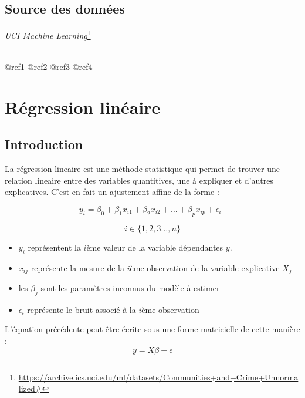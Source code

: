 \documentclass[
]{book}
\providecommand{\tightlist}{%
  \setlength{\itemsep}{0pt}\setlength{\parskip}{0pt}}
\begin{document}
\hypertarget{source-des-donnuxe9es}{%
\section{Source des données}\label{source-des-donnuxe9es}}

\emph{UCI Machine Learning}\footnote{\url{https://archive.ics.uci.edu/ml/datasets/Communities+and+Crime+Unnormalized\#}}\strut \\
@ref1
@ref2
@ref3
@ref4

\hypertarget{linearModel}{%
\chapter{Régression linéaire}\label{linearModel}}

\hypertarget{introduction-1}{%
\section{Introduction}\label{introduction-1}}

La régression lineaire est une méthode statistique qui permet de trouver une relation lineaire entre des variables quantitives, une à expliquer et d'autres explicatives. C'est en fait un ajustement affine de la forme :

\begin{equation}
y_i = \beta_0 + \beta_1x_{i1} + \beta_2x_{i2} +\dots+\beta_px_{ip}+\epsilon_{i}\;\; 
\end{equation}

\[i\in\{1,2,3\dots,n\}\]

\begin{itemize}
\tightlist
\item
  \(y_i\) représentent la \(i\)ème valeur de la variable dépendantes \(y\).
\item
  \(x_{ij}\) représente la mesure de la \(i\)ème observation de la variable explicative \(X_j\)
\item
  les \(\beta_j\) sont les paramètres inconnus du modèle à estimer
\item
  \(\epsilon_i\) représente le bruit associé à la \(i\)ème observation\\
\end{itemize}

L'équation précédente peut être écrite sous une forme matricielle de cette manière :\\

\begin{equation}
y = X\beta +\epsilon
\end{equation}
\end{document}

